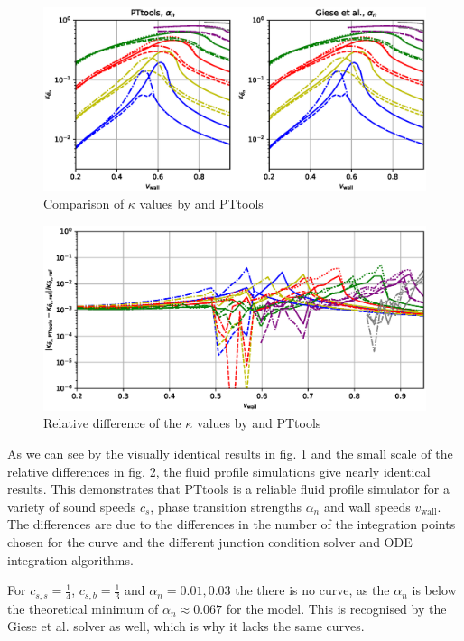\begin{figure}[ht!]
\centering
\includegraphics[width=\textwidth]{msc2-python/fig/giese_lisa_fig2_alpha_n.eps}
\caption{Comparison of $\kappa$ values by \cite[fig. 2]{giese_2021} and PTtools}
\label{fig:kappa_giese}
\end{figure}

\begin{figure}[ht!]
\centering
\includegraphics[width=\textwidth]{msc2-python/fig/giese_lisa_fig2_alpha_n_diff.eps}
\caption{Relative difference of the $\kappa$ values by \cite[fig. 2]{giese_2021} and PTtools}
\label{fig:kappa_giese_diff}
\end{figure}

As we can see by the visually identical results in fig. \ref{fig:kappa_giese}
and the small scale of the relative differences in fig. \ref{fig:kappa_giese_diff},
the fluid profile simulations give nearly identical results.
This demonstrates that PTtools is a reliable fluid profile simulator for a variety of
sound speeds $c_s$, phase transition strengths $\alpha_n$ and wall speeds $v_\text{wall}$.
The differences are due to the differences in the number of the integration points chosen for the curve
and the different junction condition solver and ODE integration algorithms.

For $c_{s,s}=\frac{1}{4}$, $c_{s,b}=\frac{1}{3}$ and $\alpha_n = 0.01, 0.03$ the there is no curve,
as the $\alpha_n$ is below the theoretical minimum of $\alpha_n \approx 0.067$ for the model.
This is recognised by the Giese et al. solver as well,
which is why it lacks the same curves.

